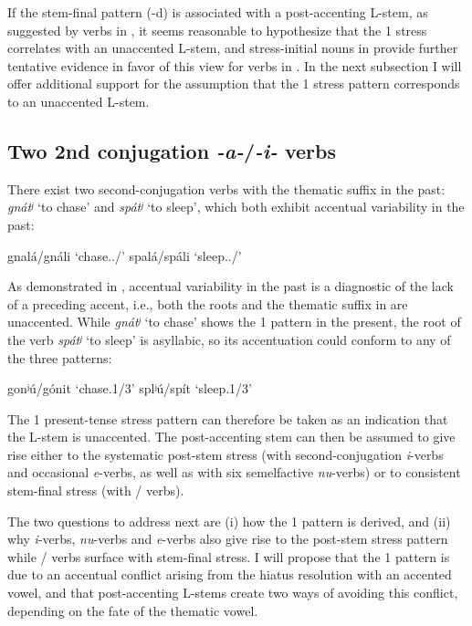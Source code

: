 \documentclass[output=paper,colorlinks,citecolor=black,koreanfont]{langscibook}
\begin{document}
\noindent If the stem-final pattern (-d) is associated with a post-accenting L-stem, as suggested by verbs in , it seems reasonable to hypothesize that the {1\SG} stress correlates with an unaccented L-stem, and stress-initial nouns in  provide further tentative evidence in favor of this view for verbs in . In the next subsection I will offer additional support for the assumption that the {1\SG} stress pattern corresponds to an unaccented L-stem.

\subsection{Two 2nd conjugation \textit{-a-}/\textit{-i-} verbs}

There exist two second-conjugation verbs with the thematic suffix  in the past: \textit{gnátʲ} ‘to chase’ and \textit{spátʲ} ‘to sleep’, which both exhibit accentual variability in the past:

\ea\label{mat:ex:GnatSpatPst}
\ea gnalá/gnáli ‘chase.{\PST.\FEM}{\SG}/{\PL}’
\ex spalá/spáli ‘sleep.{\PST.\FEM}{\SG}/{\PL}’
\z
\z

\noindent As demonstrated in , accentual variability in the past is a diagnostic of the lack of a preceding accent, i.e., both the roots and the thematic suffix in  are unaccented. While \textit{gnátʲ} ‘to chase’ shows the {1\SG} pattern in the present, the root of the verb \textit{spátʲ} ‘to sleep’ is asyllabic, so its accentuation could conform to any of the three patterns:

\ea\label{mat:ex:GnatSpatPrs}
\ea gonʲú/gónit ‘chase.{1\SG}/{3\SG}’
\ex splʲú/spít ‘sleep.{1\SG}/{3\SG}’
\z
\z

\noindent The {1\SG} present-tense stress pattern can therefore be taken as an indication that the L-stem is unaccented. The post-accenting stem can then be assumed to give rise either to the systematic post-stem stress (with second-conjugation \textit{i}-verbs and occasional \textit{e}-verbs, as well as with six semelfactive \textit{nu}-verbs) or to consistent stem-final stress (with / verbs).

The two questions to address next are (i) how the {1\SG} pattern is derived, and (ii) why \textit{i}-verbs, \textit{nu}-verbs and \textit{e}-verbs also give rise to the post-stem stress pattern while / verbs surface with stem-final stress. I will propose that the {1\SG} pattern is due to an accentual conflict arising from the hiatus resolution with an accented vowel, and that post-accenting L-stems create two ways of avoiding this conflict, depending on the fate of the thematic vowel.
\end{document}
